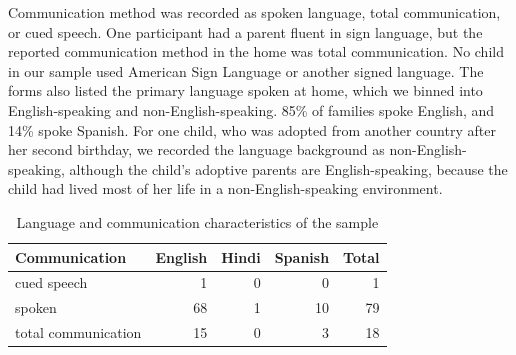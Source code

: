 \documentclass[english,man]{apa6}
\begin{document}
\begin{table}[!h]

\caption{\label{tab:amp-info}Audiological Characteristics of the Sample}
\centering
{}
\end{table}

Communication method was recorded as spoken language, total communication, or cued speech. One participant had a parent fluent in sign language, but the reported communication method in the home was total communication. No child in our sample used American Sign Language or another signed language. The forms also listed the primary language spoken at home, which we binned into English-speaking and non-English-speaking. 85\% of families spoke English, and 14\% spoke Spanish. For one child, who was adopted from another country after her second birthday, we recorded the language background as non-English-speaking, although the child's adoptive parents are English-speaking, because the child had lived most of her life in a non-English-speaking environment.

\begin{table}[!h]

\caption{\label{tab:comm-info}Language and communication characteristics of the sample}
\centering
\begin{tabular}[t]{l|r|r|r|r}
\hline
Communication & English & Hindi & Spanish & Total\\
\hline
cued speech & 1 & 0 & 0 & 1\\
\hline
spoken & 68 & 1 & 10 & 79\\
\hline
total communication & 15 & 0 & 3 & 18\\
\hline
\end{tabular}
\end{table}
\end{document}
